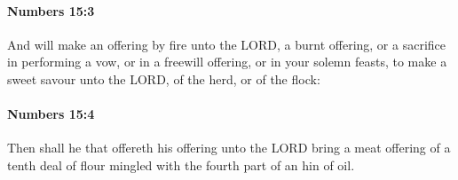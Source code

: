 		\paragraph{Numbers 15:3} %
			\label{NUMBERS-15-3}

			And will make an offering by fire unto the LORD, a burnt offering, or a sacrifice in performing a vow, or in a freewill offering, or in your solemn feasts, to make a sweet savour unto the LORD, of the herd, or of the flock:


		\paragraph{Numbers 15:4} %
			\label{NUMBERS-15-4}

			Then shall he that offereth his offering unto the LORD bring a meat offering of a tenth deal of flour mingled with the fourth part of an hin of oil.

